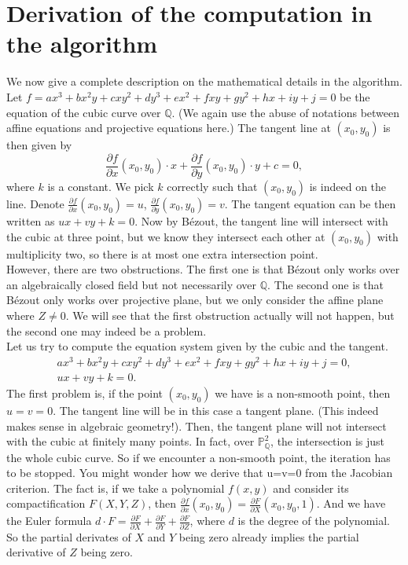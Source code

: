 \documentclass[a4paper,oneside,11pt]{article}
\newcommand{\bP}{\mathbb{P}}
\newcommand{\bQ}{\mathbb{Q}}
\theoremstyle{definition}
\begin{document}
\section{Derivation of the computation in the algorithm}
We now give a complete description on the mathematical details in the algorithm.\\
Let $f=ax^3+bx^2y+cxy^2+dy^3+ex^2+fxy+gy^2+hx+iy+j=0$ be the equation of the cubic curve over $\bQ$. (We again use the abuse of notations between affine equations and projective equations here.) The tangent line at $(x_0,y_0)$ is then given by
\[
	\frac{\partial f}{\partial x}(x_0,y_0) \cdot x + \frac{\partial f}{\partial y}(x_0,y_0) \cdot y + c = 0,
\]
where $k$ is a constant. We pick $k$ correctly such that $(x_0,y_0)$ is indeed on the line. Denote $\frac{\partial f}{\partial x}(x_0,y_0) = u$, $\frac{\partial f}{\partial y}(x_0,y_0) = v$. The tangent equation can be then written as $ux+vy+k=0$. Now by B\'ezout, the tangent line will intersect with the cubic at three point, but we know they intersect each other at $(x_0,y_0)$ with multiplicity two, so there is at most one extra intersection point.\\
However, there are two obstructions. The first one is that B\'ezout only works over an algebraically closed field but not necessarily over $\bQ$. The second one is that B\'ezout only works over projective plane, but we only consider the affine plane where $Z\neq 0$. We will see that the first obstruction actually will not happen, but the second one may indeed be a problem.\\
Let us try to compute the equation system given by the cubic and the tangent.
\begin{align*}
	ax^3+bx^2y+cxy^2+dy^3+ex^2+fxy+gy^2+hx+iy+j=0,\\
	ux+vy+k=0.
\end{align*}
The first problem is, if the point $(x_0,y_0)$ we have is a non-smooth point, then $u=v=0$. The tangent line will be in this case a tangent plane. (This indeed makes sense in algebraic geometry!). Then, the tangent plane will not intersect with the cubic at finitely many points. In fact, over $\bP^2_\bQ$, the intersection is just the whole cubic curve. So if we encounter a non-smooth point, the iteration has to be stopped.
You might wonder how we derive that u=v=0 from the Jacobian criterion. The fact is, if we take a polynomial $f(x,y)$ and consider its compactification $F(X,Y,Z)$, then $\frac{\partial f}{\partial x}(x_0,y_0)=\frac{\partial F}{\partial X}(x_0,y_0,1)$. And we have the Euler formula $d\cdot F=\frac{\partial F}{\partial X}+\frac{\partial F}{\partial Y}+\frac{\partial F}{\partial Z}$, where $d$ is the degree of the polynomial. So the partial derivates of $X$ and $Y$ being zero already implies the partial derivative of $Z$ being zero.\\
\end{document}
